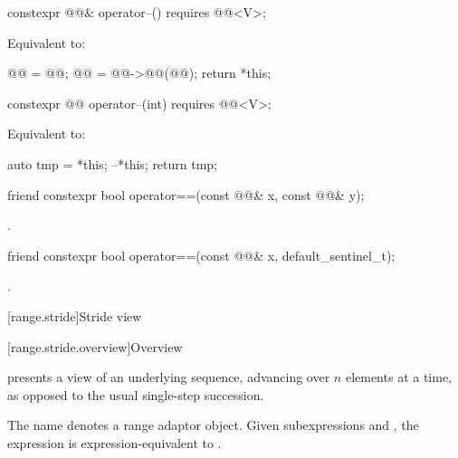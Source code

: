 \begin{itemdecl}
constexpr @@& operator--() requires @@<V>;
\end{itemdecl}

\begin{itemdescr}
\pnum
\effects
Equivalent to:
\begin{codeblock}
@@ = @@;
@@ = @@->@@(@@);
return *this;
\end{codeblock}
\end{itemdescr}

\begin{itemdecl}
constexpr @@ operator--(int) requires @@<V>;
\end{itemdecl}

\begin{itemdescr}
\pnum
\effects
Equivalent to:
\begin{codeblock}
auto tmp = *this;
--*this;
return tmp;
\end{codeblock}
\end{itemdescr}

\begin{itemdecl}
friend constexpr bool operator==(const @@& x, const @@& y);
\end{itemdecl}

\begin{itemdescr}
\pnum
\returns
{}.
\end{itemdescr}

\begin{itemdecl}
friend constexpr bool operator==(const @@& x, default_sentinel_t);
\end{itemdecl}

\begin{itemdescr}
\pnum
\returns
{}.
\end{itemdescr}

[range.stride]{Stride view}

[range.stride.overview]{Overview}

\pnum
{} presents a view of an underlying sequence,
advancing over $n$ elements at a time,
as opposed to the usual single-step succession.

\pnum
The name  denotes
a range adaptor object.
Given subexpressions  and ,
the expression 
is expression-equivalent to .

